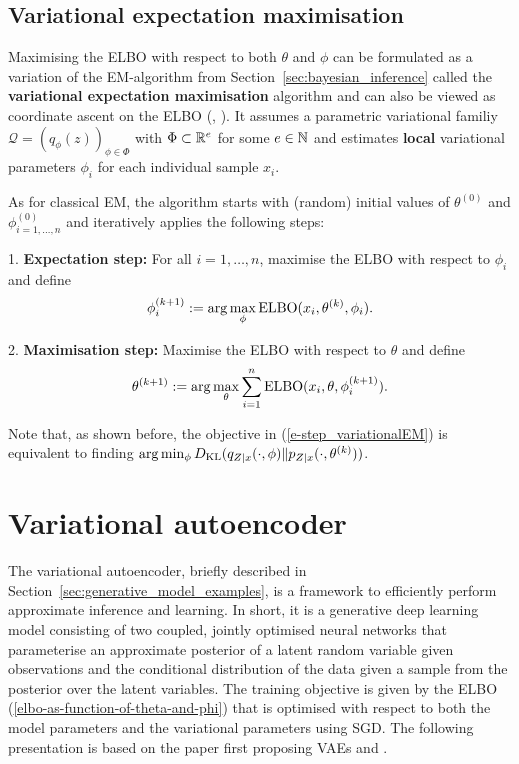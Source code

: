 \subsection{Variational expectation maximisation}\label{sec:variational_EM}

Maximising the ELBO with respect to both $\theta$ and $\phi$ can be formulated as a variation of the EM-algorithm from Section~\ref{sec:bayesian_inference} called the \textbf{variational expectation maximisation} algorithm and can also be viewed as coordinate ascent on the ELBO (\cite[p.~71]{Kingma2019}, \cite{NealHinton1998}). It assumes a parametric variational familiy $\mathcal{Q} = (q_{\phi}(z))_{\phi\in\Phi}$ with $\Phi \subset \mathbb{R}^e$ for some $e\in \mathbb{N}$ and estimates \textbf{local} variational parameters $\phi_i$ for each individual sample $x_i$.

As for classical EM, the algorithm starts with (random) initial values of $\theta^{(0)}$ and $\phi_{i=1,\dots, n}^{(0)}$ and iteratively applies the following steps: 

1. \textbf{Expectation step:} For all $i=1,\dots, n$, maximise the ELBO with respect to $\phi_i$ and define
\begin{equation}\label{e-step_variationalEM}
\phi_i^{(k+1)} := \arg \max_{\phi} \mathrm{ELBO}(x_i,\theta^{(k)}, \phi_i).
\end{equation}

2. \textbf{Maximisation step:} Maximise the ELBO with respect to $\theta$ and define
\begin{equation}
\theta^{(k+1)} := \arg \max_{\theta} \sum_{i=1}^n \mathrm{ELBO}(x_i,\theta, \phi_i^{(k+1)}).
\end{equation}

Note that, as shown before, the objective in (\ref{e-step_variationalEM}) is equivalent to finding $\arg \min_{\phi} D_{\mathrm{KL}}(q_{Z\mid x}(\cdot,\phi) \Vert p_{Z\mid x}(\cdot,\theta^{(k)}))$.

\section{Variational autoencoder}\label{sec:VAE}

The variational autoencoder, briefly described in Section~\ref{sec:generative_model_examples}, is a framework to efficiently perform approximate inference and learning. In short, it is a generative deep learning model consisting of two coupled, jointly optimised neural networks that parameterise an approximate posterior of a latent random variable given observations and the conditional distribution of the data given a sample from the posterior over the latent variables. The training objective is given by the ELBO (\ref{elbo-as-function-of-theta-and-phi}) that is optimised with respect to both the model parameters and the variational parameters using SGD. The following presentation is based on the paper first proposing VAEs \cite{Kingma2013} and \cite[pp.~15-27]{Kingma2019}.

